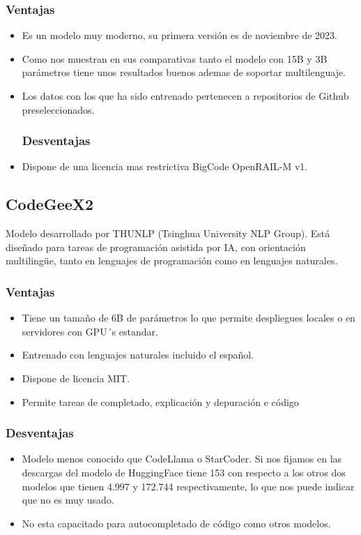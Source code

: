 \subsubsection{Ventajas}
\begin{itemize}
	\item Es un modelo muy moderno, su primera versión es de noviembre de 2023.
	\item Como nos muestran en sus comparativas tanto el modelo con 15B y 3B parámetros tiene unos resultados buenos ademas de soportar multilenguaje.
    \item Los datos con los que ha sido entrenado pertenecen a repositorios de Github preseleccionados.
\subsubsection{Desventajas}
\end{itemize}
\begin{itemize}
    \item Dispone de una licencia mas restrictiva BigCode OpenRAIL-M v1.
\end{itemize}
\subsection{CodeGeeX2}
Modelo desarrollado por THUNLP (Tsinghua University NLP Group). Está diseñado para tareas de programación asistida por IA, con orientación multilingüe, tanto en lenguajes de programación como en lenguajes naturales.
\subsubsection{Ventajas}
\begin{itemize}
\item Tiene un tamaño de 6B de parámetros lo que permite despliegues locales o en servidores con GPU´s estandar.
\item Entrenado con lenguajes naturales incluido el español.
\item Dispone de licencia MIT.
\item Permite tareas de completado, explicación y depuración e código
\end{itemize}
\subsubsection{Desventajas}
\begin{itemize}
    \item Modelo menos conocido que CodeLlama o StarCoder. Si nos fijamos en las descargas del modelo de HuggingFace \cite{HuggingFace} tiene 153 con respecto a los otros dos modelos que tienen  4.997 y 172.744 respectivamente, lo que nos puede indicar que no es muy usado.
    \item No esta capacitado para autocompletado de código como otros modelos.
\end{itemize}